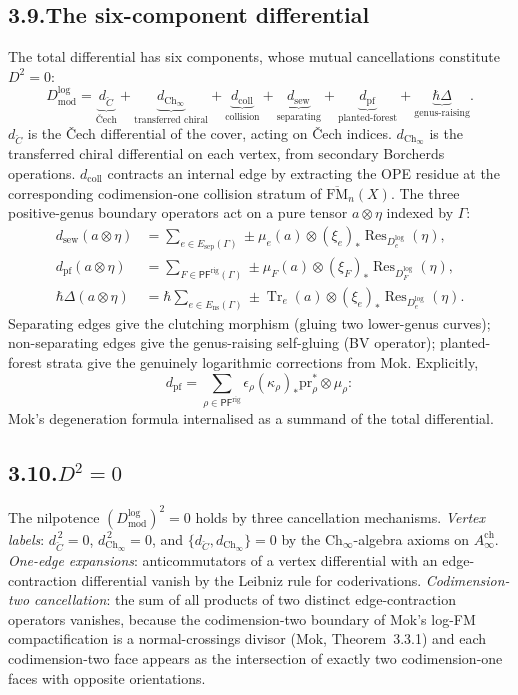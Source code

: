 \documentclass[11pt]{report}
\theoremstyle{definition}
\theoremstyle{remark}
\numberwithin{equation}{section}
\begin{document}
\subsection*{3.9.\enspace The six-component differential}

The total differential has six components, whose mutual cancellations
constitute $D^2=0$:
\[
D^{\log}_{\mathrm{mod}}=\underbrace{d_{\check C}}_{\text{\v Cech}}+\underbrace{d_{\mathrm{Ch}_\infty}}_{\text{transferred chiral}}+\underbrace{d_{\mathrm{coll}}}_{\text{collision}}+\underbrace{d_{\mathrm{sew}}}_{\text{separating}}+\underbrace{d_{\mathrm{pf}}}_{\text{planted-forest}}+\underbrace{\hbar\Delta}_{\text{genus-raising}}.
\]
$d_{\check C}$ is the \v Cech differential of the cover, acting on
\v Cech indices. $d_{\mathrm{Ch}_\infty}$ is the transferred chiral
differential on each vertex, from secondary Borcherds operations.
$d_{\mathrm{coll}}$ contracts an internal edge by extracting the OPE
residue at the corresponding codimension-one collision stratum of
$\overline{\mathrm{FM}}_n(X)$. The three positive-genus boundary
operators act on a pure tensor $a\otimes\eta$ indexed by $\Gamma$:
\begin{align*}
d_{\mathrm{sew}}(a\otimes\eta)&=\sum_{e\in E_{\mathrm{sep}}(\Gamma)}\pm\mu_e(a)\otimes(\xi_e)_*\operatorname{Res}_{D_e^{\log}}(\eta),\\
d_{\mathrm{pf}}(a\otimes\eta)&=\sum_{F\in\mathsf{PF}^{\mathrm{rig}}(\Gamma)}\pm\mu_F(a)\otimes(\xi_F)_*\operatorname{Res}_{D_F^{\log}}(\eta),\\
\hbar\Delta(a\otimes\eta)&=\hbar\sum_{e\in E_{\mathrm{ns}}(\Gamma)}\pm\operatorname{Tr}_e(a)\otimes(\xi_e)_*\operatorname{Res}_{D_e^{\log}}(\eta).
\end{align*}
Separating edges give the clutching morphism (gluing two lower-genus
curves); non-separating edges give the genus-raising self-gluing
(BV operator); planted-forest strata give the genuinely logarithmic
corrections from Mok. Explicitly,
\[
d_{\mathrm{pf}}=\sum_{\rho\in\mathsf{PF}^{\mathrm{rig}}}\epsilon_\rho(\kappa_\rho)_*\mathrm{pr}_\rho^*\otimes\mu_\rho:
\]
Mok's degeneration formula internalised as a summand of the total
differential.

\subsection*{3.10.\enspace $D^2=0$}

The nilpotence $(D^{\log}_{\mathrm{mod}})^2=0$ holds by three
cancellation mechanisms. \emph{Vertex labels}: $d_{\check C}^{\,2}=0$,
$d_{\mathrm{Ch}_\infty}^{\,2}=0$, and
$\{d_{\check C},d_{\mathrm{Ch}_\infty}\}=0$ by the
$\mathrm{Ch}_\infty$-algebra axioms on $A^{\mathrm{ch}}_\infty$.
\emph{One-edge expansions}: anticommutators of a vertex differential
with an edge-contraction differential vanish by the Leibniz rule for
coderivations. \emph{Codimension-two cancellation}: the sum of all
products of two distinct edge-contraction operators vanishes, because
the codimension-two boundary of Mok's log-FM compactification is a
normal-crossings divisor (Mok, Theorem~3.3.1) and each codimension-two
face appears as the intersection of exactly two codimension-one faces
with opposite orientations.
\end{document}
